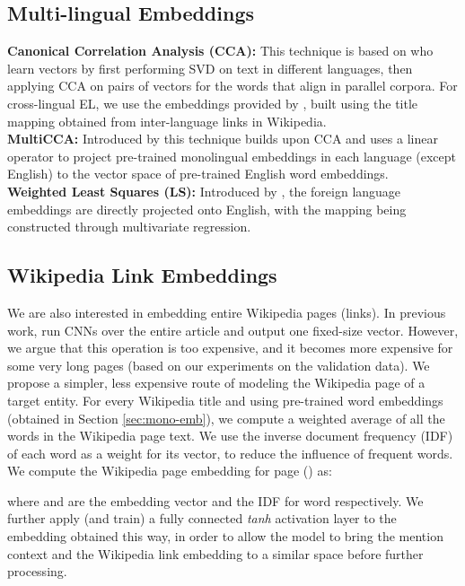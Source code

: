 \documentclass[letterpaper]{article} \usepackage{aaai18}  \usepackage{times}  \usepackage{helvet}  \usepackage{courier}  \usepackage{url}  \usepackage{graphicx}  \frenchspacing  \setlength{\pdfpagewidth}{8.5in}  \setlength{\pdfpageheight}{11in}  \usepackage{latexsym}
\begin{document}
\subsection{Multi-lingual Embeddings}
\textbf{Canonical Correlation Analysis (CCA):} This technique is based on \cite{faruqui2014improving} who learn vectors by first performing SVD on
text in different languages, then applying CCA on pairs of vectors for the 
words that align in parallel corpora. For cross-lingual EL, we use the embeddings provided by \cite{tsai2016cross}, built using the title mapping obtained from inter-language links in Wikipedia.\\
\textbf{MultiCCA:} Introduced by \cite{ammar2016massively} this technique builds upon CCA and uses a linear operator to project pre-trained monolingual embeddings in each language (except English) to the vector space of pre-trained English word embeddings.
\\
\textbf{Weighted Least Squares (LS):} Introduced by \cite{mikolov2013exploiting}, the foreign language embeddings are directly projected onto English, with the mapping being constructed through multivariate regression.
\\
\subsection{Wikipedia Link Embeddings} \label{sec:WikiEmbeddings}
We are also interested in embedding entire Wikipedia pages (links). In previous work, \cite{berkeleyNNEL} run CNNs over the entire article and output one fixed-size vector. However, we argue that this operation is too expensive, and it becomes more expensive for some very long pages (based on our experiments on the validation data). We propose a simpler, less expensive route of modeling the Wikipedia page of a target entity.  For every Wikipedia title and using pre-trained word embeddings (obtained in Section \ref{sec:mono-emb}), we compute a weighted average of all the words in the Wikipedia page text. We use the inverse document frequency (IDF) of each word as a weight for its vector, to reduce the influence of frequent words. We compute the Wikipedia page embedding for page  () as:

where  and  are the embedding vector and the IDF for word  respectively. 
We further apply (and train) a fully connected \textit{tanh} activation layer to the embedding obtained this way, in order to allow the model to bring the mention context and the Wikipedia link embedding to a similar space before further processing.
\end{document}
